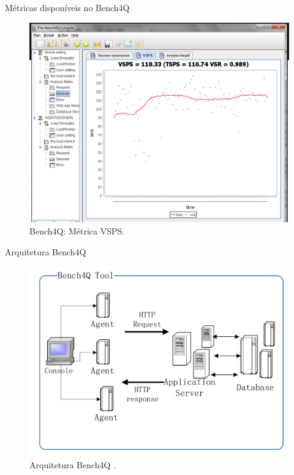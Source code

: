 \begin{frame}{Métricas disponíveis no Bench4Q}
\begin{figure}
	\begin{center}
		\includegraphics[scale=0.5]{images/metricas.png}
			\caption{Bench4Q: Métrica VSPS.}
					\label{fig:vsps-bench4q}
	\end{center}
\end{figure}

\end{frame}

\begin{frame}{Arquitetura Bench4Q}
	\begin{figure}
		\begin{center}
			\includegraphics[scale=0.2]{images/bench4Q.png}
			\caption{Arquitetura Bench4Q \cite{Bench4Q}.}
			\label{fig:arquitetura-bench4q}
		\end{center}
	\end{figure}
\end{frame}

